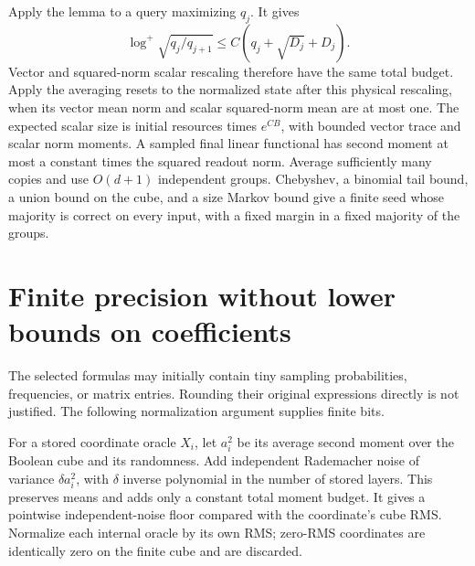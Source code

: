 \documentclass[11pt]{article}
\begin{document}
Apply the lemma to a query maximizing $q_j$. It gives
\[
 \log^+\sqrt{q_j/q_{j+1}}\le C(q_j+\sqrt{D_j}+D_j).
\]
Vector and squared-norm scalar rescaling therefore have the same total budget. Apply the averaging resets to the normalized state after this physical rescaling, when its vector mean norm and scalar squared-norm mean are at most one. The expected scalar size is initial resources times $e^{CB}$, with bounded vector trace and scalar norm moments. A sampled final linear functional has second moment at most a constant times the squared readout norm. Average sufficiently many copies and use $O(d+1)$ independent groups. Chebyshev, a binomial tail bound, a union bound on the cube, and a size Markov bound give a finite seed whose majority is correct on every input, with a fixed margin in a fixed majority of the groups.

\section{Finite precision without lower bounds on coefficients}
\label{sec:precision}
The selected formulas may initially contain tiny sampling probabilities, frequencies, or matrix entries. Rounding their original expressions directly is not justified. The following normalization argument supplies finite bits.

For a stored coordinate oracle $X_i$, let $a_i^2$ be its average second moment over the Boolean cube and its randomness. Add independent Rademacher noise of variance $\delta a_i^2$, with $\delta$ inverse polynomial in the number of stored layers. This preserves means and adds only a constant total moment budget. It gives a pointwise independent-noise floor compared with the coordinate's cube RMS. Normalize each internal oracle by its own RMS; zero-RMS coordinates are identically zero on the finite cube and are discarded.
\end{document}

